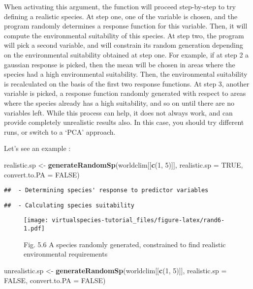 \documentclass[]{article}
\newenvironment{Shaded}{\begin{snugshade}}{\end{snugshade}}
\newcommand{\KeywordTok}[1]{\textcolor[rgb]{0.13,0.29,0.53}{\textbf{#1}}}
\newcommand{\DataTypeTok}[1]{\textcolor[rgb]{0.13,0.29,0.53}{#1}}
\newcommand{\DecValTok}[1]{\textcolor[rgb]{0.00,0.00,0.81}{#1}}
\newcommand{\StringTok}[1]{\textcolor[rgb]{0.31,0.60,0.02}{#1}}
\newcommand{\OtherTok}[1]{\textcolor[rgb]{0.56,0.35,0.01}{#1}}
\newcommand{\NormalTok}[1]{#1}
\begin{document}
When activating this argument, the function will proceed step-by-step to
try defining a realistic species. At step one, one of the variable is
chosen, and the program randomly determines a response function for this
variable. Then, it will compute the environmental suitability of this
species. At step two, the program will pick a second variable, and will
constrain its random generation depending on the environmental
suitability obtained at step one. For example, if at step 2 a gaussian
response is picked, then the mean will be chosen in areas where the
species had a high environmental suitability. Then, the environmental
suitability is recalculated on the basis of the first two response
functions. At step 3, another variable is picked, a response function
randomly generated with respect to areas where the species already has a
high suitability, and so on until there are no variables left. While
this process can help, it does not always work, and can provide
completely unrealistic results also. In this case, you should try
different runs, or switch to a `PCA' approach.

Let's see an example :

\begin{Shaded}
\begin{Highlighting}[]
\NormalTok{realistic.sp <-}\StringTok{ }\KeywordTok{generateRandomSp}\NormalTok{(worldclim[[}\KeywordTok{c}\NormalTok{(}\DecValTok{1}\NormalTok{, }\DecValTok{5}\NormalTok{)]],}
                                 \DataTypeTok{realistic.sp =} \OtherTok{TRUE}\NormalTok{,}
                                 \DataTypeTok{convert.to.PA =} \OtherTok{FALSE}\NormalTok{)}
\end{Highlighting}
\end{Shaded}

\begin{verbatim}
##  - Determining species' response to predictor variables
\end{verbatim}

\begin{verbatim}
##  - Calculating species suitability
\end{verbatim}

\begin{figure}
\centering
\texttt{[image: virtualspecies-tutorial\_files/figure-latex/rand6-1.pdf]}
\caption{Fig. 5.6 A species randomly generated, constrained to find
realistic environmental requirements}
\end{figure}

\begin{Shaded}
\begin{Highlighting}[]
\NormalTok{unrealistic.sp <-}\StringTok{ }\KeywordTok{generateRandomSp}\NormalTok{(worldclim[[}\KeywordTok{c}\NormalTok{(}\DecValTok{1}\NormalTok{, }\DecValTok{5}\NormalTok{)]],}
                                   \DataTypeTok{realistic.sp =} \OtherTok{FALSE}\NormalTok{,}
                                   \DataTypeTok{convert.to.PA =} \OtherTok{FALSE}\NormalTok{)}
\end{Highlighting}
\end{Shaded}
\end{document}
